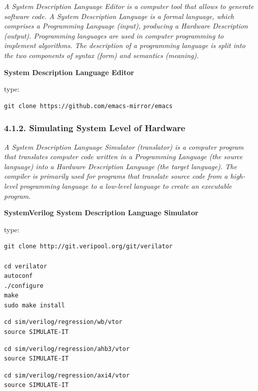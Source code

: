 \documentclass[]{article}
\begin{document}
\emph{A System Description Language Editor is a computer tool that
allows to generate software code. A System Description Language is a
formal language, which comprises a Programming Language (input),
producing a Hardware Description (output). Programming languages are
used in computer programming to implement algorithms. The description of
a programming language is split into the two components of syntax (form)
and semantics (meaning).}

\textbf{System Description Language Editor}

type:

\begin{verbatim}
git clone https://github.com/emacs-mirror/emacs
\end{verbatim}

\subsubsection{4.1.2. Simulating System Level of
Hardware}\label{simulating-system-level-of-hardware}

\emph{A System Description Language Simulator (translator) is a computer
program that translates computer code written in a Programming Language
(the source language) into a Hardware Description Language (the target
language). The compiler is primarily used for programs that translate
source code from a high-level programming language to a low-level
language to create an executable program.}

\textbf{SystemVerilog System Description Language Simulator}

type:

\begin{verbatim}
git clone http://git.veripool.org/git/verilator

cd verilator
autoconf
./configure
make
sudo make install
\end{verbatim}

\begin{verbatim}
cd sim/verilog/regression/wb/vtor
source SIMULATE-IT
\end{verbatim}

\begin{verbatim}
cd sim/verilog/regression/ahb3/vtor
source SIMULATE-IT
\end{verbatim}

\begin{verbatim}
cd sim/verilog/regression/axi4/vtor
source SIMULATE-IT
\end{verbatim}
\end{document}
